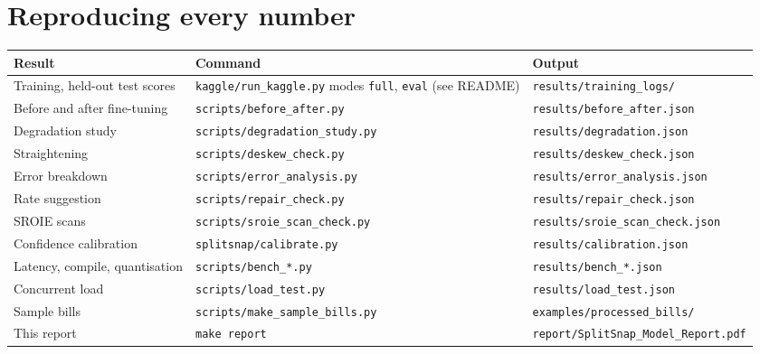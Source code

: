 \section{Reproducing every number}\label{app:repro}
{\footnotesize
\begin{tabular}{@{}p{4.6cm}p{6.6cm}p{4.6cm}@{}}
\toprule
Result & Command & Output\\
\midrule
Training, held-out test scores & \texttt{kaggle/run\_kaggle.py} modes \texttt{full}, \texttt{eval} (see README) & \texttt{results/training\_logs/}\\
Before and after fine-tuning & \texttt{scripts/before\_after.py} & \texttt{results/before\_after.json}\\
Degradation study & \texttt{scripts/degradation\_study.py} & \texttt{results/degradation.json}\\
Straightening & \texttt{scripts/deskew\_check.py} & \texttt{results/deskew\_check.json}\\
Error breakdown & \texttt{scripts/error\_analysis.py} & \texttt{results/error\_analysis.json}\\
Rate suggestion & \texttt{scripts/repair\_check.py} & \texttt{results/repair\_check.json}\\
SROIE scans & \texttt{scripts/sroie\_scan\_check.py} & \texttt{results/sroie\_scan\_check.json}\\
Confidence calibration & \texttt{splitsnap/calibrate.py} & \texttt{results/calibration.json}\\
Latency, compile, quantisation & \texttt{scripts/bench\_*.py} & \texttt{results/bench\_*.json}\\
Concurrent load & \texttt{scripts/load\_test.py} & \texttt{results/load\_test.json}\\
Sample bills & \texttt{scripts/make\_sample\_bills.py} & \texttt{examples/processed\_bills/}\\
This report & \texttt{make report} & \texttt{report/SplitSnap\_Model\_Report.pdf}\\
\bottomrule
\end{tabular}}
